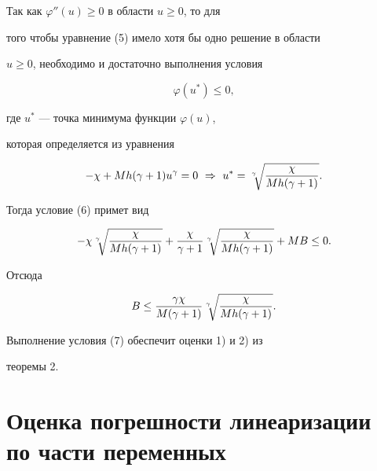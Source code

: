 \begin{note}


Так как $\varphi''(u)\ge0$ в области $u\ge0$, то для


того чтобы уравнение (5) имело хотя бы одно решение в области


$u\ge0$, необходимо и достаточно выполнения условия


\begin{equation}


\varphi(u^*)\le0,


\end{equation}


где $u^*$ --- точка минимума функции $\varphi(u)$,


которая определяется из уравнения


$$


-\chi+Mh(\gamma+1)u^{\gamma}=0 \ \Rightarrow \


u^*=\sqrt[\uproot{2}\gamma\ ]{\frac{\chi}{Mh(\gamma+1)}}.


$$


Тогда условие (6) примет вид


$$


-\chi\sqrt[\uproot{2}\gamma\ ]{\frac{\chi}{Mh(\gamma+1)}}+


\frac{\chi}{\gamma+1}\sqrt[\uproot{2}\gamma\ ]{\frac{\chi}{Mh(\gamma+1)}}


+MB\le0.


$$


Отсюда


\begin{equation}


B\le\frac{\gamma\chi}{M(\gamma+1)}\sqrt[\uproot{2}\gamma\ ]{\frac{\chi}


{Mh(\gamma+1)}}.


\end{equation}


Выполнение условия (7) обеспечит оценки 1) и 2) из


теоремы 2.


\end{note}








\section{Оценка погрешности линеаризации по части переменных}





